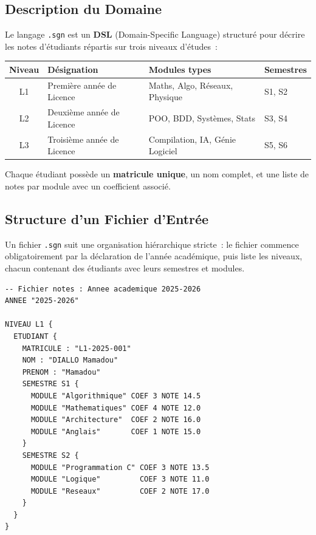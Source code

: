 \documentclass[a4paper,12pt]{article}
\begin{document}
\subsection{Description du Domaine}

Le langage \texttt{.sgn} est un \textbf{DSL} (Domain-Specific Language) structuré pour décrire les notes d'étudiants répartis sur trois niveaux d'études~:

\begin{center}
\begin{tabular}{clll}
\toprule
\textbf{Niveau} & \textbf{Désignation} & \textbf{Modules types} & \textbf{Semestres} \\
\midrule
L1 & Première année de Licence & Maths, Algo, Réseaux, Physique & S1, S2 \\
L2 & Deuxième année de Licence & POO, BDD, Systèmes, Stats     & S3, S4 \\
L3 & Troisième année de Licence & Compilation, IA, Génie Logiciel & S5, S6 \\
\bottomrule
\end{tabular}
\end{center}

Chaque étudiant possède un \textbf{matricule unique}, un nom complet, et une liste de notes par module avec un coefficient associé.

\subsection{Structure d'un Fichier d'Entrée}

Un fichier \texttt{.sgn} suit une organisation hiérarchique stricte~: le fichier commence obligatoirement par la déclaration de l'année académique, puis liste les niveaux, chacun contenant des étudiants avec leurs semestres et modules.

\begin{lstlisting}[caption={Extrait d'un fichier .sgn valide}, style=sgn, label=lst:exemple-sgn]
-- Fichier notes : Annee academique 2025-2026
ANNEE "2025-2026"

NIVEAU L1 {
  ETUDIANT {
    MATRICULE : "L1-2025-001"
    NOM : "DIALLO Mamadou"
    PRENOM : "Mamadou"
    SEMESTRE S1 {
      MODULE "Algorithmique" COEF 3 NOTE 14.5
      MODULE "Mathematiques" COEF 4 NOTE 12.0
      MODULE "Architecture"  COEF 2 NOTE 16.0
      MODULE "Anglais"       COEF 1 NOTE 15.0
    }
    SEMESTRE S2 {
      MODULE "Programmation C" COEF 3 NOTE 13.5
      MODULE "Logique"         COEF 3 NOTE 11.0
      MODULE "Reseaux"         COEF 2 NOTE 17.0
    }
  }
}
\end{lstlisting}
\end{document}
